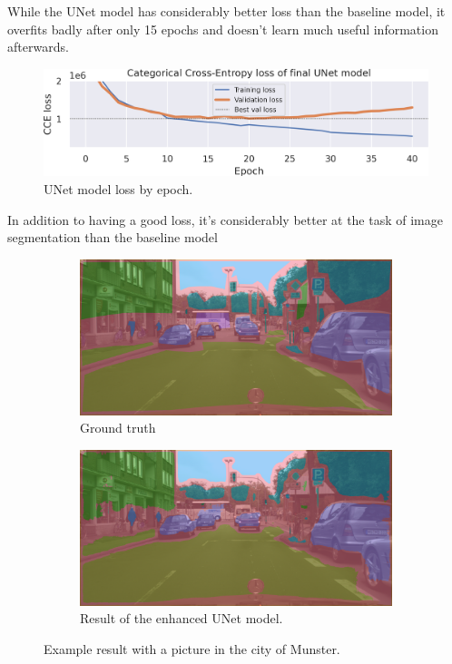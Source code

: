 While the UNet model has considerably better loss than the baseline model, it overfits badly after only 15 epochs and doesn't learn much useful information afterwards.

\begin{figure}[h]
	\centering
	\includegraphics[width=.9\textwidth]{unet_loss.png}
	\caption{UNet model loss by epoch.}
	\label{unet_model_loss}
\end{figure}

In addition to having a good loss, it's considerably better at the task of image segmentation than the baseline model

\begin{figure}[h]
	\begin{subfigure}{.5\textwidth}
		\includegraphics[width=\textwidth]{city_images/unet_gt_pic.png}
		\caption{Ground truth}
	\end{subfigure}
	\begin{subfigure}{.5\textwidth}
		\includegraphics[width=\textwidth]{city_images/unet_pic.png}
		\caption{Result of the enhanced UNet model.}
	\end{subfigure}
	\caption{Example result with a picture in the city of Munster.}
\end{figure}

